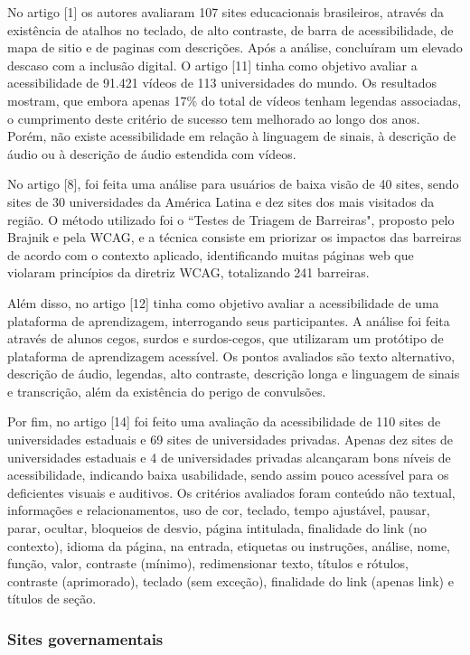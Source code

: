 \documentclass[a4paper]{article}
\begin{document}
\begin{titlepage}
No artigo [1] os autores avaliaram 107 sites educacionais brasileiros, através da existência de atalhos no teclado, de alto contraste, de barra de acessibilidade, de mapa de sitio e de paginas com descrições. Após a análise, concluíram um elevado descaso com a inclusão digital. O artigo [11] tinha como objetivo avaliar a acessibilidade de 91.421 vídeos de 113 universidades do mundo. Os resultados mostram, que embora apenas 17\% do total de vídeos tenham legendas associadas, o cumprimento deste critério de sucesso tem melhorado ao longo dos anos. Porém, não existe acessibilidade em relação à linguagem de sinais, à descrição de áudio ou à descrição de áudio estendida com vídeos.

No artigo [8], foi feita uma análise para usuários de baixa visão de 40 sites, sendo sites de 30 universidades da América Latina e dez sites dos mais visitados da região. O método utilizado foi o ``Testes de Triagem de Barreiras", proposto pelo Brajnik e pela WCAG, e a técnica consiste em priorizar os impactos das barreiras de acordo com o contexto aplicado, identificando muitas páginas web que violaram princípios da diretriz WCAG, totalizando 241 barreiras.

Além disso, no artigo [12] tinha como objetivo avaliar a acessibilidade de uma plataforma de aprendizagem, interrogando seus participantes. A análise foi feita através de alunos cegos, surdos e surdos-cegos, que utilizaram um protótipo de plataforma de aprendizagem acessível. Os pontos avaliados são texto alternativo, descrição de áudio, legendas, alto contraste, descrição longa e linguagem de sinais e transcrição, além da existência do perigo de convulsões. 

Por fim, no artigo [14] foi feito uma avaliação da acessibilidade de 110 sites de universidades estaduais e 69 sites de universidades privadas. Apenas dez sites de universidades estaduais e 4 de universidades privadas alcançaram bons níveis de acessibilidade, indicando baixa usabilidade, sendo assim pouco acessível para os deficientes visuais e auditivos. Os critérios avaliados foram conteúdo não textual, informações e relacionamentos, uso de cor, teclado, tempo ajustável, pausar, parar, ocultar, bloqueios de desvio, página intitulada, finalidade do link (no contexto), idioma da página, na entrada, etiquetas ou instruções, análise, nome, função, valor, contraste (mínimo), redimensionar texto, títulos e rótulos, contraste (aprimorado), teclado (sem exceção), finalidade do link (apenas link) e títulos de seção.

\subsubsection{Sites governamentais}


\end{titlepage}
\end{document}
